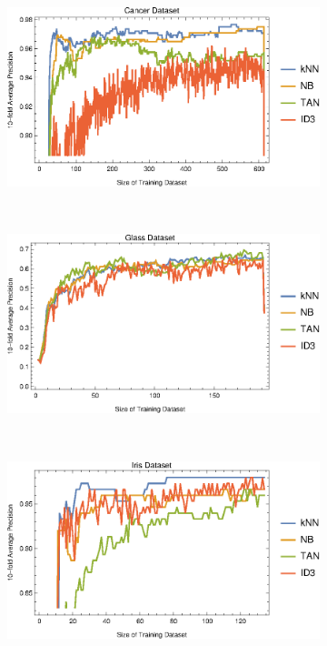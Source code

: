 \documentclass{article}
\begin{document}
	
		\label{conv}
		\begin{figure}[h]
			\centering
			\begin{subfigure}[b]{0.49\textwidth}
				\centering
				\includegraphics[width=\textwidth]{figs/plot_conv_cancer}					
			\end{subfigure}	\	
			\begin{subfigure}[b]{0.49\textwidth}
				\centering
				\includegraphics[width=\textwidth]{figs/plot_conv_glass}					
			\end{subfigure} \	
			\begin{subfigure}[b]{0.49\textwidth}
				\centering
				\includegraphics[width=\textwidth]{figs/plot_conv_iris}					

\end{subfigure}
\end{figure}
\end{document}
